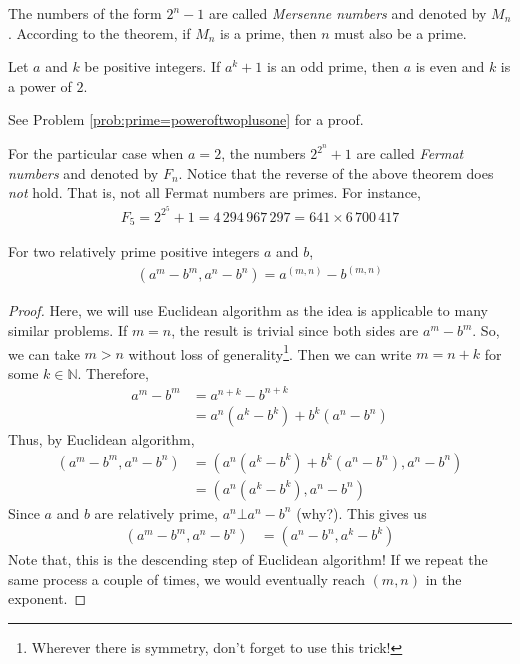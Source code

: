 \documentclass{subfile}
\begin{document}
	\begin{remark}
		The numbers of the form $2^n-1$ are called \textit{Mersenne numbers} and denoted by $M_n$. According to the theorem, if $M_n$ is a prime, then $n$ must also be a prime.
	\end{remark}

	\begin{theorem}\label{thm:primec}
		Let $a$ and $k$ be positive integers. If $a^k+1$ is an odd prime, then $a$ is even and $k$ is a power of $2$.
	\end{theorem}

	See Problem \ref{prob:prime=poweroftwoplusone} for a proof.

	\begin{remark}
		For the particular case when $a=2$, the numbers $2^{2^n}+1$ are called \textit{Fermat numbers} and denoted by $F_n$. Notice that the reverse of the above theorem does \textit{not} hold. That is, not all Fermat numbers are primes. For instance,
		\begin{align*}
			F_5 = 2^{2^5}+1 = 4\, 294\, 967\, 297 = 641 \times 6\, 700\, 417
		\end{align*}
	\end{remark}

	\begin{theorem}
		For two relatively prime positive integers $a$ and $b$,
		\begin{align*}
			(a^m-b^m,a^n-b^n)=a^{(m,n)}-b^{(m,n)}
		\end{align*}
	\end{theorem}

	\begin{proof}
		Here, we will use Euclidean algorithm as the idea is applicable to many similar problems. If $m=n$, the result is trivial since both sides are $a^m-b^m$. So, we can take $m>n$ without loss of generality\footnote{Wherever there is symmetry, don't forget to use this trick!}. Then we can write $m=n+k$ for some $k\in\mathbb{N}$. Therefore,
		\begin{align*}
			a^m-b^m
				& = a^{n+k}-b^{n+k}\\
				& = a^n(a^k-b^k)+b^k(a^n-b^n)
		\end{align*}
		Thus, by Euclidean algorithm,
		\begin{align*}
			(a^m-b^m,a^n-b^n) & = (a^n(a^k-b^k)+b^k(a^n-b^n),a^n-b^n)\\
			&=(a^n(a^k-b^k),a^n-b^n)
		\end{align*}
		Since $a$ and $b$ are relatively prime, $a^n\bot a^n-b^n$ (why?). This gives us
		\begin{align*}
			(a^m-b^m,a^n-b^n) & = (a^n-b^n,a^k-b^k)
		\end{align*}
		Note that, this is the descending step of Euclidean algorithm! If we repeat the same process a couple of times, we would eventually reach $(m,n)$ in the exponent.
	\end{proof}
\end{document}
